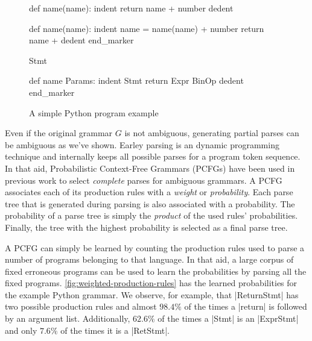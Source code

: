 \begin{figure}[t]
\centering
\begin{minipage}[c]{0.56\linewidth}
\begin{ecode}
def name(name): \n
indent return name + number \n
dedent \n

def name(name): \n
indent name = name(name) + number \n
return name + \n
dedent end_marker
\end{ecode}
\label{fig:prog-seq}
\end{minipage}%
\hspace{0.02\linewidth}%
\begin{minipage}[c]{0.42\linewidth}
\begin{ecode}
Stmt \n

def name Params: \n
indent Stmt \n
return Expr BinOp \n
dedent end_marker
\end{ecode}
\label{fig:abstract-prog-seq}
\end{minipage}
\caption{A simple Python program example}
\end{figure}

Even if the original grammar $G$ is not ambiguous, generating partial parses can
be ambiguous as we've shown. Earley parsing is an dynamic programming technique
and internally keeps all possible parses for a program token sequence. In that
aid, Probabilistic Context-Free Grammars (PCFGs) have been used in previous work
\citep{Collins_2013, Jelinek_1992} to select \emph{complete} parses for
ambiguous grammars. A PCFG associates each of its production rules with a
\emph{weight} or \emph{probability}. Each parse tree that is generated during
parsing is also associated with a probability. The probability of a parse tree
is simply the \emph{product} of the used rules' probabilities. Finally, the tree
with the highest probability is selected as a final parse tree.

A PCFG can simply be learned \citep{Collins_2013} by counting the production
rules used to parse a number of programs belonging to that language. In that
aid, a large corpus of fixed erroneous programs can be used to learn the
probabilities by parsing all the fixed programs.
\autoref{fig:weighted-production-rules} has the learned probabilities for the
example Python grammar. We observe, for example, that |ReturnStmt| has two
possible production rules and almost $98.4\%$ of the times a |return| is
followed by an argument list. Additionally, $62.6\%$ of the times a |Stmt| is an
|ExprStmt| and only $7.6\%$ of the times it is a |RetStmt|.


